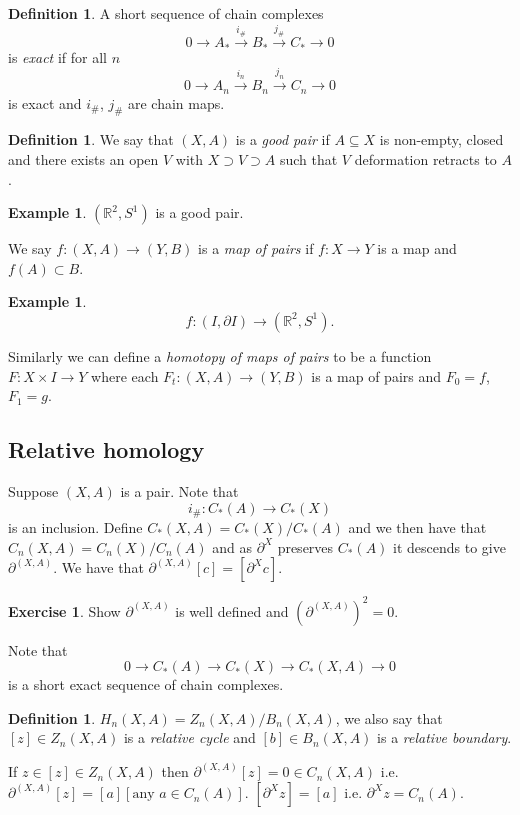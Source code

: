 \documentclass[12pt]{article}
\theoremstyle{definition}
\theoremstyle{definition}
\newtheorem{defn}[thm]{Definition}
\newtheorem{ex}[thm]{Example}
\newtheorem*{exer}{Exercise}
\newcommand{\RR}{\mathbb{R}}
\newcommand{\C}{C_*}
\begin{document}
\begin{defn}
A short sequence of chain complexes
\[
0 \to A_* \xrightarrow{i_\#} B_* \xrightarrow{j_\#} C_* \to 0
\]
is \emph{exact} if for all $n$
\[
0 \to A_n \xrightarrow{i_n} B_n \xrightarrow{j_n} C_n \to 0
\]
is exact and $i_\#$, $j_\#$ are chain maps.
\end{defn}

\begin{defn}
We say that $(X,A)$ is a \emph{good pair} if $A\subseteq X$ is non-empty, closed and there exists an open $V$ with $X\supset V \supset A$ such that $V$ deformation retracts to $A$.
\end{defn}

\begin{ex}
$(\RR^2,S^1)$ is a good pair.
\end{ex}

We say $f\colon (X,A) \to (Y,B)$ is a \emph{map of pairs} if $f\colon X \to Y$ is a map and $f(A)  \subset B$.
\begin{ex}
\[
f\colon (I, \partial I) \to (\RR^2, S^1).
\]
\end{ex}
Similarly we can define a \emph{homotopy of maps of pairs} to be a function $F\colon X\times I \to Y$ where each $F_t\colon (X,A)\to (Y,B)$ is a map of pairs and $F_0= f$, $F_1 = g$.

\subsection{Relative homology}
Suppose $(X,A)$ is a pair.
Note that 
\[
i_\# \colon \C(A) \to \C(X)
\]
is an inclusion.
Define $\C(X,A) = \C(X)/\C(A)$ and we then have that $C_n(X,A) = C_n(X)/C_n(A)$ and as $\partial^X$ preserves $\C(A)$ it descends to give $\partial^{(X,A)}$.
We have that $\partial^{(X,A)}[c] = [\partial^X c]$.

\begin{exer}
Show $\partial^{(X,A)}$ is well defined and $(\partial^{(X,A)})^2 = 0$.
\end{exer}

Note that 
\[
0 \to \C(A) \to \C(X) \to \C(X,A) \to 0
\]
is a short exact sequence of chain complexes.

\begin{defn}
$H_n(X,A) = Z_n(X,A) / B_n(X,A)$, we also say that $[z] \in Z_n(X,A)$ is a \emph{relative cycle} and $[b]\in B_n(X,A)$ is a \emph{relative boundary}.
\end{defn}

If $z \in [z] \in Z_n(X,A)$ then $\partial^{(X,A)}[z] = 0 \in C_n(X,A)$ i.e. $\partial^{(X,A)}[z] = [a][\text{any }a\in C_n(A)]$.
$[\partial^X z] = [a]$ i.e. $\partial^X z = C_n(A)$.
\end{document}
